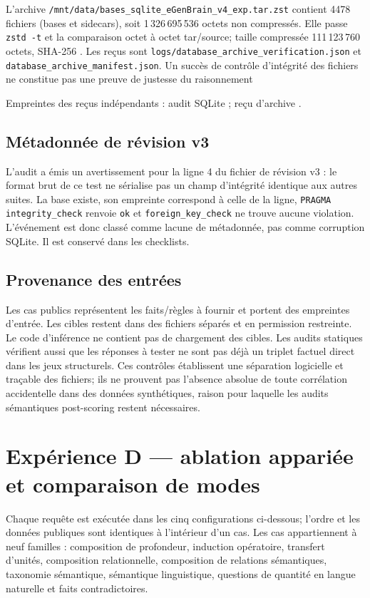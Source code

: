 \documentclass[11pt,a4paper]{article}
\begin{document}
L’archive \texttt{/mnt/data/bases\_sqlite\_eGenBrain\_v4\_exp.tar.zst} contient 4478 fichiers (bases et sidecars), soit 1\,326\,695\,536 octets non compressés. Elle passe \texttt{zstd -t} et la comparaison octet à octet tar/source; taille compressée 111\,123\,760 octets, SHA-256 \texttt{}. Les reçus sont \texttt{logs/database\_archive\_verification.json} et \texttt{database\_archive\_manifest.json}. Un succès de contrôle d’intégrité des fichiers ne constitue pas une preuve de justesse du raisonnement

Empreintes des reçus indépendants : audit SQLite \texttt{}; reçu d’archive \texttt{}.

\subsection{Métadonnée de révision v3}
L’audit a émis un avertissement pour la ligne 4 du fichier de révision v3 : le format brut de ce test ne sérialise pas un champ d’intégrité identique aux autres suites. La base existe, son empreinte correspond à celle de la ligne, \texttt{PRAGMA integrity\_check} renvoie \texttt{ok} et \texttt{foreign\_key\_check} ne trouve aucune violation. L’événement est donc classé comme lacune de métadonnée, pas comme corruption SQLite. Il est conservé dans les checklists.

\subsection{Provenance des entrées}
Les cas publics représentent les faits/règles à fournir et portent des empreintes d’entrée. Les cibles restent dans des fichiers séparés et en permission restreinte. Le code d’inférence ne contient pas de chargement des cibles. Les audits statiques vérifient aussi que les réponses à tester ne sont pas déjà un triplet factuel direct dans les jeux structurels. Ces contrôles établissent une séparation logicielle et traçable des fichiers; ils ne prouvent pas l’absence absolue de toute corrélation accidentelle dans des données synthétiques, raison pour laquelle les audits sémantiques post-scoring restent nécessaires.

\section{Expérience D — ablation appariée et comparaison de modes}
Chaque requête est exécutée dans les cinq configurations ci-dessous; l’ordre et les données publiques sont identiques à l’intérieur d’un cas. Les cas appartiennent à neuf familles : composition de profondeur, induction opératoire, transfert d’unités, composition relationnelle, composition de relations sémantiques, taxonomie sémantique, sémantique linguistique, questions de quantité en langue naturelle et faits contradictoires.
\end{document}
